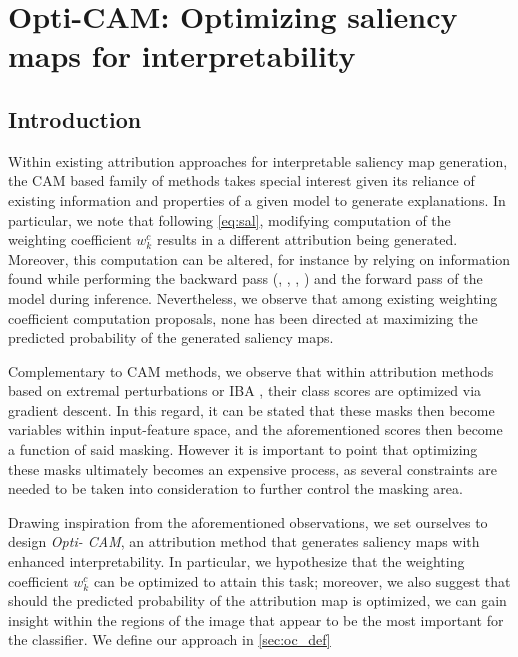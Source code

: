 \chapter{Opti-CAM: Optimizing saliency maps for interpretability}
\chaptertoc{}
\label{ch:opticam}
\section{Introduction}
\label{sec:intro}
\noindent Within existing attribution approaches for interpretable saliency map generation, the CAM 
\autocite{zhou2016learning} based family of methods takes special interest given its reliance of
existing  information and properties of a given model to generate explanations. In particular, we 
note that following \autoref{eq:sal}, modifying computation of the weighting coefficient 
$w_k^c$ results in a different attribution being generated. Moreover, this computation can be altered,
 for instance by relying on information found while performing the backward pass 
 (\cite{selvaraju2017grad}, \cite{chattopadhay2018grad}, \cite{axiombased}, 
 \cite{smilkov2017smoothgrad}) and the forward pass \autocite{wang2020score} of the model during 
 inference. Nevertheless, we observe that among existing weighting coefficient computation 
 proposals, none has been directed at maximizing the predicted probability of the generated 
 saliency maps.

Complementary to CAM methods, we observe that within attribution methods based on extremal 
perturbations \autocite{fong2019understanding} or IBA \autocite{schulz2020restricting}, 
their class scores are optimized via gradient descent. In this regard, it can 
be stated that these masks then become variables within input-feature space, and the aforementioned 
scores then become a function of said masking. However it is important to point that optimizing 
these masks ultimately becomes an expensive process, as several constraints are needed 
to be taken into consideration to further control the masking area.

Drawing inspiration from the aforementioned observations, we set ourselves to design \emph{Opti-
CAM}, an attribution method that generates saliency maps with enhanced interpretability. In 
particular, we hypothesize that the weighting coefficient $w_k^c$ can be optimized to attain this 
task; moreover, we also suggest that should the predicted probability of the attribution map is 
optimized, we can gain insight within the regions of the image that appear to be the most important 
for the classifier. We define our approach in \autoref{sec:oc_def}\\

